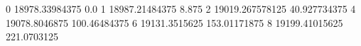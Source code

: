 0 18978.33984375 0.0
1 18987.21484375 8.875
2 19019.267578125 40.927734375
4 19078.8046875 100.46484375
6 19131.3515625 153.01171875
8 19199.41015625 221.0703125
